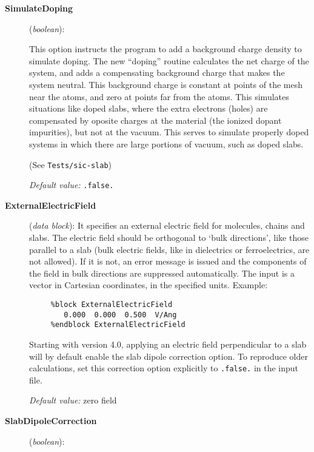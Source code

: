 \begin{description}

\item[\textbf{SimulateDoping}] (\textit{boolean}):

This option instructs the program to add a background charge density
to simulate doping.  The new ``doping'' routine calculates the net
charge of the system, and adds a compensating background charge that
makes the system neutral. This background charge is constant at points
of the mesh near the atoms, and zero at points far from the atoms.
This simulates situations like doped slabs, where the extra electrons
(holes) are compensated by oposite charges at the material (the
ionized dopant impurities), but not at the vacuum.  This serves to
simulate properly doped systems in which there are large portions of
vacuum, such as doped slabs.

(See \texttt{Tests/sic-slab})

\textit{Default value:} \texttt{.false.}

\item[\textbf{ExternalElectricField}] (\textit{data block}):
It specifies an external electric field for molecules, chains and slabs.
The electric field should be orthogonal to `bulk directions', like
those parallel to a slab (bulk electric fields, like in
dielectrics or ferroelectrics, are not allowed). If it is not, an
error message is issued and the components of the field in bulk
directions are suppressed automatically. The input is a
vector in Cartesian coordinates, in the specified units. Example:

\begin{verbatim}
     %block ExternalElectricField
        0.000  0.000  0.500  V/Ang
     %endblock ExternalElectricField
\end{verbatim}

Starting with version 4.0, applying an electric field perpendicular to
a slab will by default enable the slab dipole
correction
option. To reproduce older calculations, set this correction option
explicitly to \texttt{.false.} in the input file.

\textit{Default value:} zero field

\item[\textbf{SlabDipoleCorrection}] (\textit{boolean}):


\end{description}
